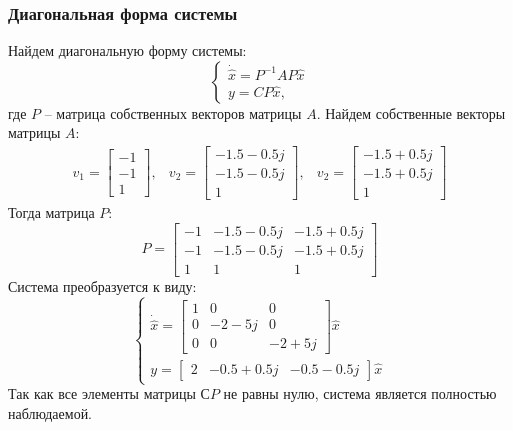 \subsubsection{Диагональная форма системы}
Найдем диагональную форму системы:
\begin{equation}
    \begin{cases}
        \dot{\hat{x}} = P^{-1}AP\hat{x}\\
        y = CP\hat{x},
    \end{cases}
\end{equation}
где $P$ -- матрица собственных векторов матрицы $A$. Найдем собственные векторы матрицы $A$:
\begin{equation}
    \begin{array}{ccc}
        v_1 = \begin{bmatrix}
            -1 \\
            -1 \\
            1
        \end{bmatrix}, &
        v_2 = \begin{bmatrix}
            -1.5-0.5j \\
            -1.5-0.5j \\
            1
        \end{bmatrix}, &
        v_2 = \begin{bmatrix}
            -1.5+0.5j \\
            -1.5+0.5j \\
            1
        \end{bmatrix}
    \end{array}
\end{equation}
Тогда матрица $P$:
\begin{equation}
    P = \begin{bmatrix}
        -1 & -1.5-0.5j & -1.5+0.5j \\
        -1 & -1.5-0.5j & -1.5+0.5j \\
        1 & 1 & 1
    \end{bmatrix}
\end{equation}
Система преобразуется к виду: 
\begin{equation}
    \begin{cases}
        \dot{\hat{x}} = \begin{bmatrix}
            1 & 0 & 0 \\
            0 & -2-5j & 0 \\
            0 & 0 & -2+5j
        \end{bmatrix} \hat{x} \\ 
        y = \begin{bmatrix}
            2 & -0.5+0.5j & -0.5-0.5j
        \end{bmatrix} \hat{x}
    \end{cases}
\end{equation}
Так как все элементы матрицы $СP$ не равны нулю, система является полностью наблюдаемой. 

